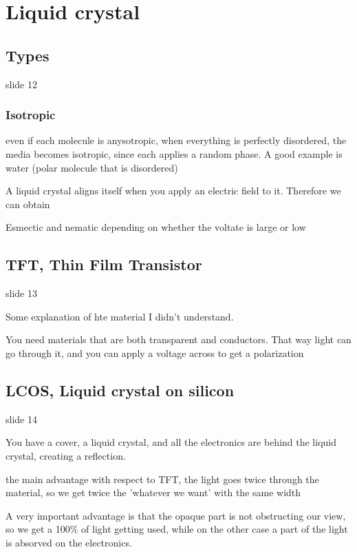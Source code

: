 \documentclass[../main/main.tex]{subfiles}
\begin{document}
\section{Liquid crystal}

\subsection{Types}

slide 12

\subsubsection{Isotropic}

even if each molecule is anysotropic, when everything is perfectly disordered, the media becomes isotropic, since each applies a random phase. A good example is water (polar molecule that is disordered)

A liquid crystal aligns itself when you apply an electric field to it. Therefore we can obtain

Esmectic and nematic depending on whether the voltate is large or low

\subsection{TFT, Thin Film Transistor}
slide 13

Some explanation of hte material I didn't understand.

You need materials that are both transparent and conductors. That way light can go through it, and you can apply a voltage across to get a polarization

\subsection{LCOS, Liquid crystal on silicon}

slide 14

You have a cover, a liquid crystal, and all the electronics are behind the liquid crystal, creating a reflection.

the main advantage with respect to TFT, the light goes twice through the material, so we get twice the 'whatever we want' with the same width

A very important advantage is that the opaque part is not obstructing our view, so we get a 100\% of light getting used, while on the other case a part of the light is absorved on the electronics.
\end{document}
